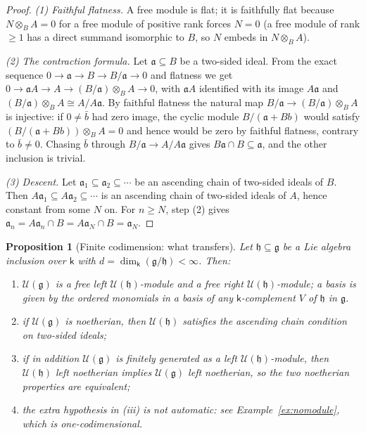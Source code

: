 \documentclass[11pt]{ctexart}
\theoremstyle{plain}
\newtheorem{proposition}[theorem]{Proposition}
\theoremstyle{definition}
\theoremstyle{remark}
\newcommand{\kk}{\mathsf{k}}
\newcommand{\gl}{\mathfrak{g}}
\newcommand{\hl}{\mathfrak{h}}
\newcommand{\UU}{\mathcal{U}}
\begin{document}
\begin{proof}
\emph{(1) Faithful flatness.} A free module is flat; it is faithfully flat because
$N\otimes_B A=0$ for a free module of positive rank forces $N=0$ (a free module of
rank $\ge1$ has a direct summand isomorphic to $B$, so $N$ embeds in $N\otimes_B A$).

\emph{(2) The contraction formula.} Let $\mathfrak{a}\subseteq B$ be a two-sided
ideal. From the exact sequence $0\to\mathfrak{a}\to B\to B/\mathfrak{a}\to0$ and
flatness we get $0\to\mathfrak{a}A\to A\to (B/\mathfrak{a})\otimes_B A\to0$, with
$\mathfrak{a}A$ identified with its image $A\mathfrak{a}$ and
$(B/\mathfrak{a})\otimes_BA\cong A/A\mathfrak{a}$. By faithful flatness the natural
map $B/\mathfrak{a}\to (B/\mathfrak{a})\otimes_B A$ is injective: if $0\neq\bar b$ had
zero image, the cyclic module $B/(\mathfrak{a}+Bb)$ would satisfy
$(B/(\mathfrak{a}+Bb))\otimes_B A=0$ and hence would be zero by faithful flatness,
contrary to $\bar b\neq0$. Chasing $\bar b$ through
$B/\mathfrak{a}\to A/A\mathfrak{a}$ gives $B\mathfrak{a}\cap B\subseteq\mathfrak{a}$,
and the other inclusion is trivial.

\emph{(3) Descent.} Let $\mathfrak{a}_1\subseteq\mathfrak{a}_2\subseteq\cdots$ be an
ascending chain of two-sided ideals of $B$. Then $A\mathfrak{a}_1\subseteq
A\mathfrak{a}_2\subseteq\cdots$ is an ascending chain of two-sided ideals of $A$,
hence constant from some $N$ on. For $n\ge N$, step (2) gives
$\mathfrak{a}_n=A\mathfrak{a}_n\cap B=A\mathfrak{a}_N\cap B=\mathfrak{a}_N$.
\end{proof}

\begin{proposition}[Finite codimension: what transfers]\label{prop:codim}
Let $\hl\subseteq\gl$ be a Lie algebra inclusion over $\kk$ with
$d=\dim_\kk(\gl/\hl)<\infty$. Then:
\begin{enumerate}
\item[(i)] $\UU(\gl)$ is a free left $\UU(\hl)$-module and a free right
$\UU(\hl)$-module; a basis is given by the ordered monomials in a basis of any
$\kk$-complement $V$ of $\hl$ in $\gl$.
\item[(ii)] if $\UU(\gl)$ is noetherian, then $\UU(\hl)$ satisfies the ascending chain
condition on two-sided ideals;
\item[(iii)] if in addition $\UU(\gl)$ is finitely generated as a left
$\UU(\hl)$-module, then $\UU(\hl)$ left noetherian implies $\UU(\gl)$ left
noetherian, so the two noetherian properties are equivalent;
\item[(iv)] the extra hypothesis in (iii) is not automatic: see
Example~\ref{ex:nomodule}, which is one-codimensional.
\end{enumerate}
\end{proposition}
\end{document}
